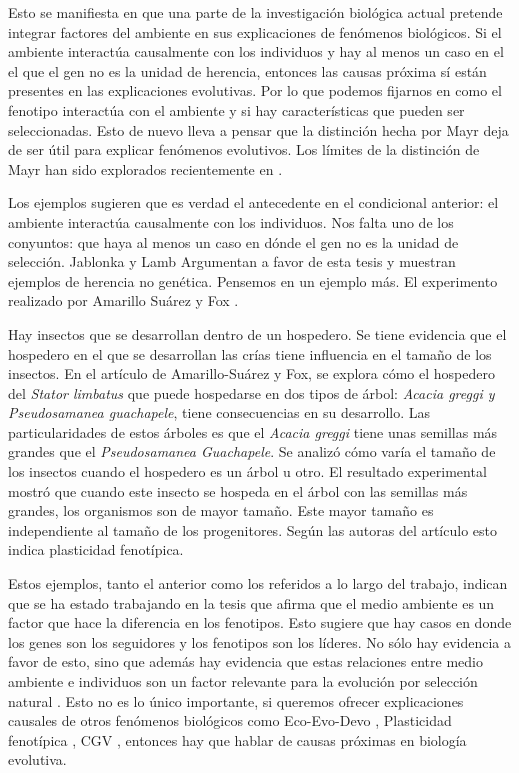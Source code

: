 Esto se manifiesta en que una parte de la investigación biológica actual pretende integrar factores del ambiente en sus explicaciones de fenómenos biológicos. Si el ambiente interactúa causalmente con los individuos y hay al menos un caso en el el que el gen no es la unidad de herencia, entonces las causas próxima sí están presentes en las explicaciones evolutivas. Por lo que podemos fijarnos en como el fenotipo interactúa con el ambiente y si hay características que pueden ser seleccionadas. Esto de nuevo lleva a pensar que la distinción hecha por Mayr deja de ser útil para explicar fenómenos evolutivos. Los límites de la distinción de Mayr han sido explorados recientemente en \cite{Uller2020, Dayan2020, Laland2011}.

Los ejemplos sugieren que es verdad el antecedente en el condicional anterior: el ambiente interactúa causalmente con los individuos. Nos falta uno de los conyuntos: que haya al menos un caso en dónde el gen no es la unidad de selección. Jablonka y Lamb Argumentan a favor de esta tesis y muestran ejemplos de herencia no genética. Pensemos en un ejemplo más. El experimento realizado por Amarillo Suárez y Fox \citeyear{Amarillo-Suarez2006}.

Hay insectos que se desarrollan dentro de un hospedero. Se tiene evidencia que el hospedero en el que se desarrollan las crías tiene influencia en el tamaño de los insectos. En el artículo de Amarillo-Suárez y Fox, se explora cómo el hospedero del \emph{Stator limbatus} que puede hospedarse en dos tipos de árbol: \emph{Acacia greggi y Pseudosamanea guachapele}, tiene consecuencias en su desarrollo. Las particularidades de estos árboles es que el \emph{Acacia greggi} tiene unas semillas más grandes que el \emph{Pseudosamanea Guachapele}. Se analizó cómo varía el tamaño de los insectos cuando el hospedero es un árbol u otro. El resultado experimental mostró que cuando este insecto se hospeda en el árbol con las semillas más grandes, los organismos son de mayor tamaño. Este mayor tamaño es independiente al tamaño de los progenitores. Según las autoras del artículo esto indica plasticidad fenotípica.

Estos ejemplos, tanto el anterior como los referidos a lo largo del trabajo, indican que se ha estado trabajando en la tesis que afirma que el medio ambiente es un factor que hace la diferencia en los fenotipos. Esto sugiere que hay casos en donde los genes son los seguidores y los fenotipos son los líderes. No sólo hay evidencia a favor de esto, sino que además hay evidencia que estas relaciones entre medio ambiente e individuos son un factor relevante para la evolución por selección natural \cite{Jablonka2020, Dayan2020, MacColl2011}. Esto no es lo único importante, si queremos ofrecer explicaciones causales de otros fenómenos biológicos como Eco-Evo-Devo \cite{PfenningEco-Evo-Devo}, Plasticidad fenotípica \cite{WESTEBERHARD20082701}, CGV \cite{CVG}, entonces hay que hablar de causas próximas en biología evolutiva.

